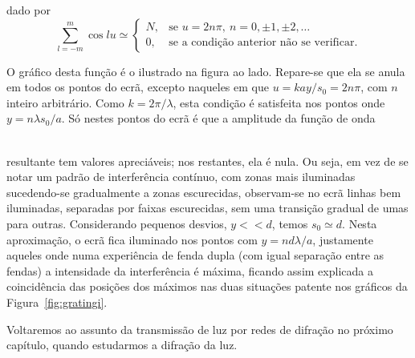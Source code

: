 dado por
\begin{equation}\label{eq:sumcos}
\sum_{l=-m}^m\cos lu\simeq
\begin{cases}
  N,&\text{se }u=2n\pi,\ n=0,\pm1,\pm2,\ldots\\
  0,&\text{se a condição anterior não se verificar.}
\end{cases}
\end{equation}
\begin{minipage}[t]{0.55\linewidth}
O gráfico desta função é o ilustrado na figura ao lado. Repare-se que ela 
se anula em todos os pontos do ecrã, excepto naqueles em que $u=kay/s_0=2n\pi$,
com $n$ inteiro arbitrário. Como $k=2\pi/\lambda$, esta condição é satisfeita
nos pontos onde $y=n\lambda s_0/a$. Só nestes pontos do ecrã é que a amplitude
da função de onda\linebreak
\vspace{-0.6\baselineskip}
\end{minipage}\hfill
{}\\
resultante tem valores apreciáveis; nos restantes, ela é nula.
Ou seja, em vez de se notar um padrão de interferência contínuo, com zonas mais
iluminadas sucedendo-se gradualmente a zonas escurecidas, observam-se no ecrã
linhas bem iluminadas, separadas por faixas escurecidas, sem uma transição
gradual de umas para outras.
Considerando pequenos desvios, $y<<d$, temos $s_0\simeq d$. Nesta aproximação, o
ecrã fica iluminado nos pontos com $y=nd\lambda/a$, justamente aqueles onde numa
experiência de fenda dupla (com igual separação entre as fendas) a intensidade
da interferência é máxima, ficando assim explicada a coincidência das posições
dos máximos nas duas situações patente nos gráficos da
Figura~\ref{fig:gratingi}.

Voltaremos ao assunto da transmissão de luz por redes de difração no próximo
capítulo, quando estudarmos a difração da luz.


